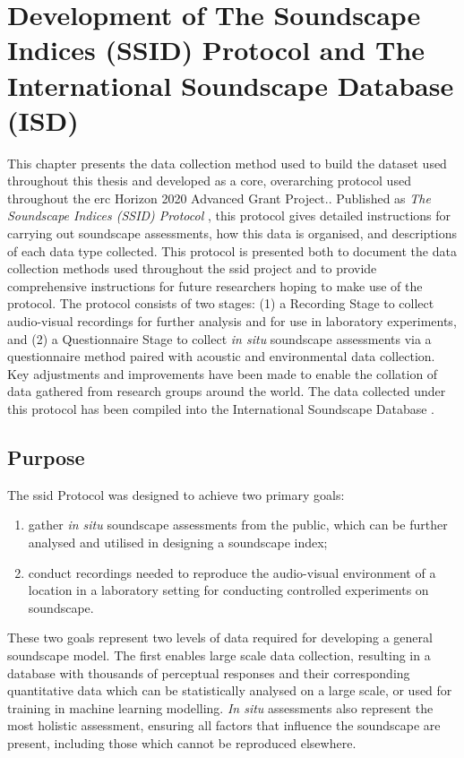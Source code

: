 \chapter{Development of The Soundscape Indices (SSID) Protocol and The International Soundscape Database (ISD)}
\label{chap:protocol}

This chapter presents the data collection method used to build the dataset used throughout this thesis and developed as a core, overarching protocol used throughout the \gls{erc} Horizon 2020 Advanced Grant  Project.. Published as \emph{The Soundscape Indices (SSID) Protocol} \citep{Mitchell2020Soundscape}, this protocol gives detailed instructions for carrying out soundscape assessments, how this data is organised, and descriptions of each data type collected. This protocol is presented both to document the data collection methods used throughout the \gls{ssid} project and to provide comprehensive instructions for future researchers hoping to make use of the protocol. The protocol consists of two stages: (1) a Recording Stage to collect audio-visual recordings for further analysis and for use in laboratory experiments, and (2) a Questionnaire Stage to collect \textit{in situ} soundscape assessments via a questionnaire method paired with acoustic and environmental data collection. Key adjustments and improvements have been made to enable the collation of data gathered from research groups around the world. The data collected under this protocol has been compiled into the International Soundscape Database \citep{Mitchell2021International}. 

\section{Purpose}

 The \gls{ssid} Protocol was designed to achieve two primary goals:
 \begin{enumerate}
   \item gather \textit{in situ} soundscape assessments from the public, which can be further analysed and utilised in designing a soundscape index;
   \item conduct recordings needed to reproduce the audio-visual environment of a location in a laboratory setting for conducting controlled experiments on soundscape.
 \end{enumerate}

 These two goals represent two levels of data required for developing a general soundscape model. The first enables large scale data collection, resulting in a database with thousands of perceptual responses and their corresponding quantitative data which can be statistically analysed on a large scale, or used for training in machine learning modelling. \textit{In situ} assessments also represent the most holistic assessment, ensuring all factors that influence the soundscape are present, including those which cannot be reproduced elsewhere.

